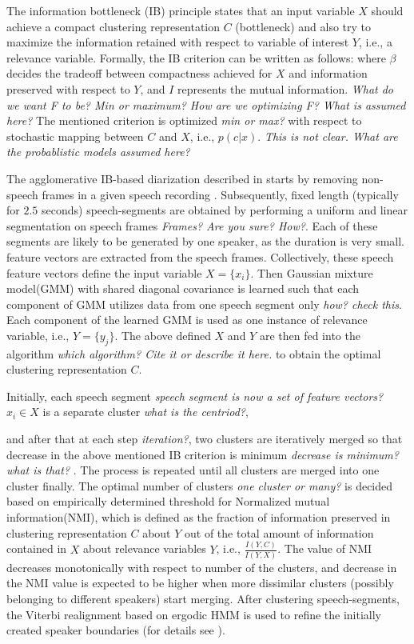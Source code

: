 \documentclass[conference]{IEEEtran}
\begin{document}
The information bottleneck (IB) principle states that an input variable $X$ should
achieve a compact clustering representation $C$ (bottleneck) and also try to
maximize the information retained with respect to variable of interest $Y$,
i.e., a relevance variable. Formally, the IB criterion can be written as
follows:
where $\beta$ decides the tradeoff between compactness achieved for $X$ and
information preserved with respect to $Y$, and $I$ represents the mutual
information. 
\textit{What do we want F to be? Min or maximum? How are we optimizing F? What
is assumed here?}
The mentioned criterion is optimized \textit{min or max?}
with respect to stochastic mapping between $C$ and $X$, i.e., $p(c|x)$.
\textit{This is not clear. What are the probablistic models assumed here?}

The agglomerative IB-based diarization described in \cite{XX} starts by 
removing non-speech frames in a given speech recording \cite{aIB2}. Subsequently, fixed length
(typically for $2.5$ seconds) speech-segments are obtained by performing a
uniform and linear segmentation on speech frames \textit{Frames? Are you sure?
How?}. Each of 
these segments are likely to be generated by one speaker, as the duration
is very small. feature vectors are extracted from the speech frames. Collectively, these 
speech feature vectors define the input
variable $X={\{x_i\}}$. Then Gaussian mixture model(GMM) with shared
diagonal covariance is learned such that each component of GMM utilizes data
from one speech segment only \textit{how? check this}. Each component of the learned
GMM is used as one instance of
relevance variable, i.e., $Y = \{ y_{j}\}$. The above defined $X$ and $Y$ are
then fed into the algorithm \textit{which algorithm? Cite it or describe it
here.} to obtain the optimal clustering representation $C$. 

Initially, each speech segment \textit{speech segment is now a set of feature
vectors?}
$x_i \in X$ is a separate cluster \textit{what is the centriod?}, 

and after that
at each step \textit{iteration?}, two clusters are iteratively merged so that decrease in the above
mentioned IB criterion is minimum \textit{decrease is minimum? what is that?}
\cite{aIB2}. The process is repeated until all
clusters are merged into one cluster finally. The optimal number of clusters
\textit{one cluster or many?}
is decided based on empirically determined threshold for Normalized mutual
information(NMI), which is defined as the fraction of information preserved in
clustering representation $C$ about $Y$ out of the total amount of information
contained in $X$ about relevance variables $Y$, i.e., $\frac{I(Y,C)}{I(Y,X)}$.
The value of NMI decreases monotonically with respect to number of the clusters,
and decrease in the NMI value is expected to be higher when more dissimilar clusters
(possibly belonging to different speakers) start merging.  After clustering
speech-segments, the Viterbi realignment based on ergodic HMM is used to refine
the initially created speaker boundaries (for details see \cite{aIB2}).
\end{document}
